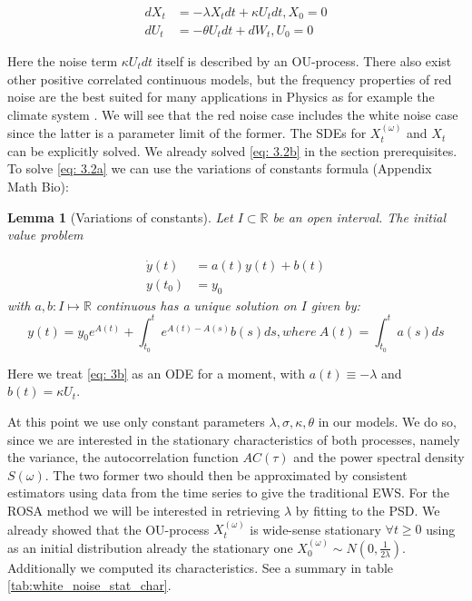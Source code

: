 \documentclass[%
thesis=student,%
coverpage=false,%
titlepage=false,%
headmarks=true, %
german,%
font=libertine, %
math=newpxtx, %
BCOR=5mm,%
coverBCOR=11mm%
]{tumbook}
\newtheorem{lemma}{Lemma}
\begin{document}
\begin{subequations}
    \begin{align}
        dX_{t} &= -\lambda X_{t}dt + \kappa U_{t}dt, X_{0} = 0 \label{eq: 3.2a} \\
        dU_{t} &= -\theta U_{t}dt + dW_{t}, U_{0} = 0 \label{eq: 3.2b}
    \end{align}
\end{subequations}

Here the noise term $\kappa U_{t}dt$ itself is described by an OU-process. There also exist other positive correlated continuous models, but the frequency properties of red noise are the best suited for many applications in Physics as for example the climate system \cite{Hasselmann:1976, Hanggi:1993, Liao:2022}. We will see that the red noise case includes the white noise case since the latter is a parameter limit of the former. The SDEs for $X_{t}^{(\omega)}$ and $X_{t}$ can be explicitly solved. We already solved \eqref{eq: 3.2b} in the section prerequisites. To solve \eqref{eq: 3.2a} we can use the variations of constants formula (Appendix Math Bio):

\begin{lemma}[Variations of constants]
    Let $I \subset \mathbb{R}$ be an open interval. The initial value problem
        
    \begin{subequations}
        \begin{align}
            \dot{y}(t) &= a(t)y(t) + b(t)  \\
            y(t_{0}) &= y_{0}
        \end{align}
    \end{subequations}
    with $a,b : I \mapsto \mathbb{R}$ continuous has a unique solution on $I$ given by:
    \[
    y(t) = y_{0}e^{A(t)} + \int_{t_{0}}^{t}e^{A(t)-A(s)}b(s)ds, where \ A(t) = \int_{t_{0}}^{t}a(s)ds
    \]
\end{lemma}

Here we treat \eqref{eq: 3b} as an ODE for a moment, with $a(t) \equiv -\lambda$ and $b(t) = \kappa U_{t}$.

At this point we use only constant parameters $\lambda,\sigma,\kappa,\theta$ in our models. We do so, since we are interested in the stationary characteristics of both processes, namely the variance, the autocorrelation function $AC(\tau)$ and the power spectral density $S(\omega)$. The two former two should then be approximated by consistent estimators using data from the time series to give the traditional EWS. For the ROSA method we will be interested in retrieving $\lambda$ by fitting to the PSD. We already showed that the OU-process $X_{t}^{(\omega)}$ is wide-sense stationary $\forall t \geq 0$ using as an initial distribution already the stationary one $X_{0}^{(\omega)} \sim N(0,\frac{1}{2\lambda})$. Additionally we computed its characteristics. See a summary in table \ref{tab:white_noise_stat_char}. 
\end{document}
